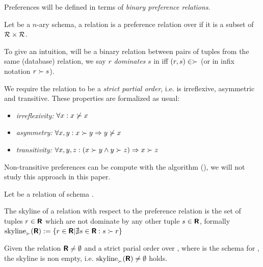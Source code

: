 Preferences will be defined in terms of \emph{binary preference relations}.
\begin{definition}
Let  be a $n$-ary schema, a relation \dominates is a preference relation over  if it is a subset of $\mathcal{R} \times \mathcal{R}$.
\end{definition}

To give an intuition, \dominates will be a binary relation between pairs of tuples from the same (database) relation, we say $r$ \emph{dominates} $s$ in \dominates iff $(r, s) \in \succ$ (or in infix notation $r \succ s$).

We require the relation \dominates to be a \emph{strict partial order}, i.e. \dominates is irreflexive, asymmetric and transitive. These properties are formalized as usual:

\begin{itemize}
\item \emph{irreflexivity:} $\forall x: x \not\succ x$
\item \emph{asymmetry:} $\forall x, y: x \succ y \Rightarrow y \not\succ x$
\item \emph{transitivity:} $\forall x, y, z: (x \succ y \land y \succ z) \Rightarrow x \succ z$
\end{itemize}

Non-transitive preferences can be compute with the  algorithm (\citep{Torlone2002, Ciaccia2004}), we will not study this approach in this paper.

\begin{definition}
\todo{}{}Let  be a relation of schema .
\end{definition}

\begin{definition}[Skyline]
The skyline of a relation  with respect to the preference relation \dominates is the set of tuples $r \in \textnormal{\bf\textsf{R}}$ which are not dominate by any other tuple $s \in \textnormal{\bf\textsf{R}}$, formally $\skyline_\dominates(\relation{R}) := \{ r \in \relation{R} | \nexists s \in \relation{R} : s \dominates r \}$
\end{definition}

\begin{lemma}
Given the relation $\textnormal{\bf\textsf{R}} \not= \emptyset$ and \dominates a strict parial order over , where  is the schema for , the skyline is non empty, i.e. $\skyline_\dominates(\relation{R}) \not= \emptyset$ holds.
\end{lemma}


